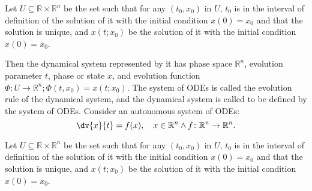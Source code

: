 \documentclass[a4paper,12pt]{report}
\begin{document}
Let $U\subseteq\mathbb{R}\times\mathbb{R}^n$ be the set such that for any $(t_0,x_0)$ in $U$, $t_0$ is in the interval of definition of the solution of it with the initial condition $x(0)=x_0$ and that the solution is unique, and $x(t;x_0)$ be the solution of it with the initial condition $x(0)=x_0$.

Then the dynamical system represented by it has phase space $\mathbb{R}^n$, evolution parameter $t$, phase or state $x$, and evolution function $\Phi\colon U\to\mathbb{R}^n;\Phi(t,x_0)=x(t;x_0)$. The system of ODEs is called the evolution rule of the dynamical system, and the dynamical system is called to be defined by the system of ODEs.
Consider an autonomous system of ODEs:
\[\dv{x}{t}=f(x), \quad x\in\mathbb{R}^n\land f\colon\mathbb{R}^n\to\mathbb{R}^n.\]

Let $U\subseteq\mathbb{R}\times\mathbb{R}^n$ be the set such that for any $(t_0,x_0)$ in $U$, $t_0$ is in the interval of definition of the solution of it with the initial condition $x(0)=x_0$ and that the solution is unique, and $x(t;x_0)$ be the solution of it with the initial condition $x(0)=x_0$.
\end{document}
